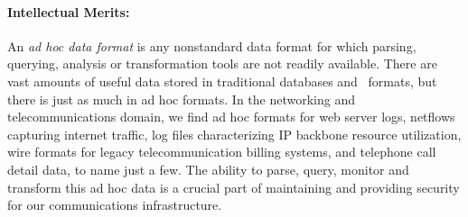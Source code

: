 
\paragraph*{Intellectual Merits:} 
An {\em ad hoc data format} is any nonstandard data format
for which parsing, querying, analysis or transformation
tools are not readily available.
There are vast amounts of useful data 
stored in traditional databases and \xml\ formats, but there is just
as much in ad hoc formats.
In the networking and telecommunications
domain, we find ad hoc formats for web server logs, 
netflows capturing internet traffic, 
log files characterizing IP backbone resource utilization,
wire formats for legacy telecommunication billing systems, 
and telephone call detail data, to name just a few.
The ability to parse, query, monitor and transform this ad hoc data
is a crucial part of maintaining and providing security for
our communications infrastructure.



